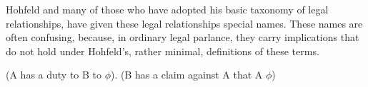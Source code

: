 Hohfeld and many of those who have adopted his basic taxonomy of legal relationships, have given these legal relationships special names.
These names are often confusing, because, in ordinary legal parlance, they carry implications that do not hold under Hohfeld's, rather minimal, definitions of these terms. 

(A has a duty to B to $\phi$). (B has a claim against A that A $\phi$)



